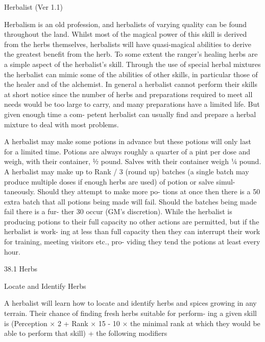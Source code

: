\begin{Chapter}{Herbalist (Ver 1.1)}

Herbalism  is  an  old  profession,  and  herbalists  of 
varying  quality  can  be  found  throughout  the  land. 
Whilst  most  of  the  magical  power  of  this  skill  is 
derived  from  the  herbs  themselves,  herbalists  will 
have  quasi-magical  abilities  to  derive  the  greatest 
benefit from the herb. To some extent the ranger’s 
healing herbs are a simple aspect of the herbalist’s 
skill.  Through  the  use  of  special  herbal  mixtures 
the  herbalist  can  mimic  some  of  the  abilities  of 
other skills, in particular those of the healer and of 
the alchemist. In general a herbalist cannot perform 
their  skills  at  short  notice  since  the  number  of 
herbs  and  preparations  required  to  meet  all  needs 
would be too large to carry, and many preparations 
have a limited life. But given enough time a com-
petent  herbalist  can  usually  find  and  prepare  a 
herbal mixture to deal with most problems. 

A herbalist may make some potions in advance but 
these  potions  will  only  last  for  a  limited  time. 
Potions  are  always  roughly  a  quarter  of  a  pint  per 
dose  and  weigh,  with  their  container,  ½  pound. 
Salves  with  their  container  weigh  ¼  pound.  A 
herbalist  may  make  up  to  Rank  /  3  (round  up) 
batches (a single batch may produce multiple doses 
if enough herbs are used) of potion or salve simul-
taneously.  Should  they  attempt  to  make  more  po-
tions  at  once  then  there  is  a  50%
extra  batch  that  all  potions  being  made  will  fail. 
Should  the  batches  being  made  fail  there  is  a  fur-
ther  30%
occur  (GM’s  discretion).  While  the  herbalist  is 
producing  potions  to  their  full  capacity  no  other 
actions  are  permitted,  but  if  the  herbalist  is  work-
ing at less than full capacity then they can interrupt 
their  work  for  training,  meeting  visitors  etc.,  pro-
viding they tend the potions at least every hour. 

38.1 Herbs 

Locate and Identify Herbs 

A  herbalist  will  learn  how  to  locate  and  identify 
herbs  and  spices  growing  in  any  terrain.  Their 
chance of finding fresh herbs suitable for perform-
ing  a  given  skill  is  (Perception  ×  2  +  Rank  × 15  - 
10 × the minimal rank at which they would be able 
to perform that skill) + the following modifiers 


\end{Chapter}
